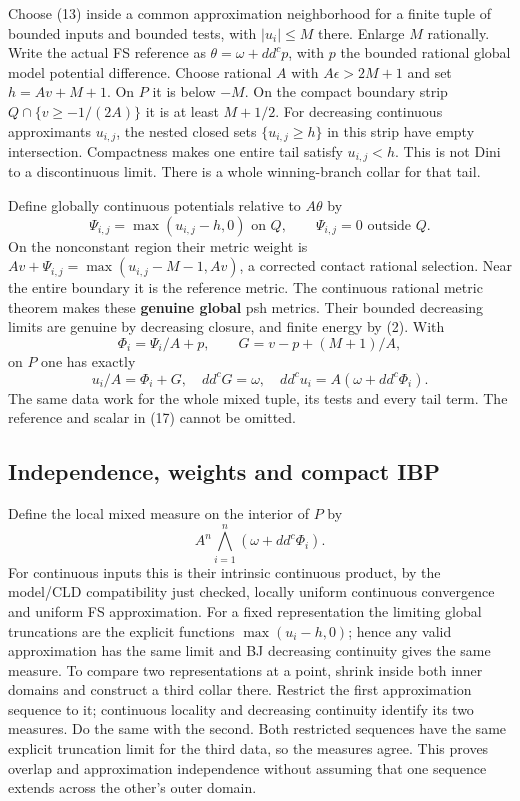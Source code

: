 \documentclass[
  11pt,
]{article}
\begin{document}
Choose (13) inside a common approximation neighborhood for a finite
tuple of bounded inputs and bounded tests, with \(|u_i|\le M\) there.
Enlarge \(M\) rationally. Write the actual FS reference as
\(\theta=\omega+dd^cp\), with \(p\) the bounded rational global model
potential difference. Choose rational \(A\) with \(A\epsilon>2M+1\) and
set \(h=Av+M+1\). On \(P\) it is below \(-M\). On the compact boundary
strip \(Q\cap\{v\ge-1/(2A)\}\) it is at least \(M+1/2\). For decreasing
continuous approximants \(u_{i,j}\), the nested closed sets
\(\{u_{i,j}\ge h\}\) in this strip have empty intersection. Compactness
makes one entire tail satisfy \(u_{i,j}<h\). This is not Dini to a
discontinuous limit. There is a whole winning-branch collar for that
tail.

Define globally continuous potentials relative to \(A\theta\) by
\[\Psi_{i,j}=\max(u_{i,j}-h,0)\text{ on }Q,
       \qquad \Psi_{i,j}=0\text{ outside }Q.\] On the nonconstant region
their metric weight is \(Av+\Psi_{i,j}=\max(u_{i,j}-M-1,Av)\), a
corrected contact rational selection. Near the entire boundary it is the
reference metric. The continuous rational metric theorem makes these
\textbf{genuine global} psh metrics. Their bounded decreasing limits are
genuine by decreasing closure, and finite energy by (2). With
\[\Phi_i=\Psi_i/A+p,\qquad G=v-p+(M+1)/A, \tag{17}\] on \(P\) one has
exactly \[u_i/A=\Phi_i+G,\quad dd^cG=\omega,
       \quad dd^cu_i=A(\omega+dd^c\Phi_i). \tag{18}\] The same data work
for the whole mixed tuple, its tests and every tail term. The reference
and scalar in (17) cannot be omitted.

\subsection{Independence, weights and compact
IBP}\label{independence-weights-and-compact-ibp}

Define the local mixed measure on the interior of \(P\) by
\[A^n\bigwedge_{i=1}^n(\omega+dd^c\Phi_i). \tag{19}\] For continuous
inputs this is their intrinsic continuous product, by the model/CLD
compatibility just checked, locally uniform continuous convergence and
uniform FS approximation. For a fixed representation the limiting global
truncations are the explicit functions \(\max(u_i-h,0)\); hence any
valid approximation has the same limit and BJ decreasing continuity
gives the same measure. To compare two representations at a point,
shrink inside both inner domains and construct a third collar there.
Restrict the first approximation sequence to it; continuous locality and
decreasing continuity identify its two measures. Do the same with the
second. Both restricted sequences have the same explicit truncation
limit for the third data, so the measures agree. This proves overlap and
approximation independence without assuming that one sequence extends
across the other's outer domain.
\end{document}

